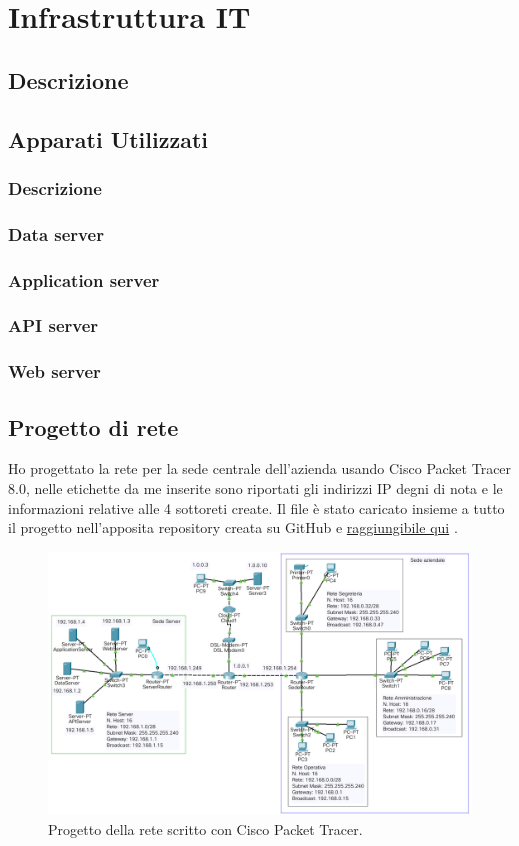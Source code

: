 \section{Infrastruttura IT}
\subsection{Descrizione}
\subsection{Apparati Utilizzati}
\subsubsection{Descrizione}
\subsubsection{Data server}
\subsubsection{Application server}
\subsubsection{API server}
\subsubsection{Web server}
\subsection{Progetto di rete} 
Ho progettato la rete per la sede centrale dell'azienda usando Cisco Packet Tracer 8.0, nelle etichette da me inserite sono riportati gli indirizzi IP degni di nota e le informazioni relative alle 4 sottoreti create. Il file è stato caricato insieme a tutto il progetto nell'apposita repository creata su GitHub e \href{https://github.com/MauroPello/elaborato}{raggiungibile qui} \cite{GitHub}. 
\begin{figure}
    \centering\includegraphics[scale=.48]{images/rete.png}
    \caption{Progetto della rete scritto con Cisco Packet Tracer. }
\end{figure}
\clearpage